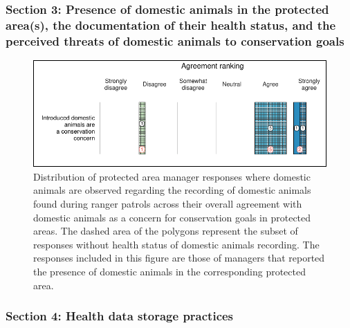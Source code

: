 \documentclass[
  letterpaper,
  DIV=11,
  numbers=noendperiod]{scrartcl}
\begin{document}
\hypertarget{section-3-presence-of-domestic-animals-in-the-protected-areas-the-documentation-of-their-health-status-and-the-perceived-threats-of-domestic-animals-to-conservation-goals}{%
\subsubsection{Section 3: Presence of domestic animals in the protected
area(s), the documentation of their health status, and the perceived
threats of domestic animals to conservation
goals}\label{section-3-presence-of-domestic-animals-in-the-protected-areas-the-documentation-of-their-health-status-and-the-perceived-threats-of-domestic-animals-to-conservation-goals}}

\begin{figure}[H]

{\centering \includegraphics{Appendix_final_files/figure-pdf/plot appendix section 3-1.pdf}

}

\caption{Distribution of protected area manager responses where domestic
animals are observed regarding the recording of domestic animals found
during ranger patrols across their overall agreement with domestic
animals as a concern for conservation goals in protected areas. The
dashed area of the polygons represent the subset of responses without
health status of domestic animals recording. The responses included in
this figure are those of managers that reported the presence of domestic
animals in the corresponding protected area.}

\end{figure}

\hypertarget{section-4-health-data-storage-practices}{%
\subsubsection{Section 4: Health data storage
practices}\label{section-4-health-data-storage-practices}}
\end{document}
